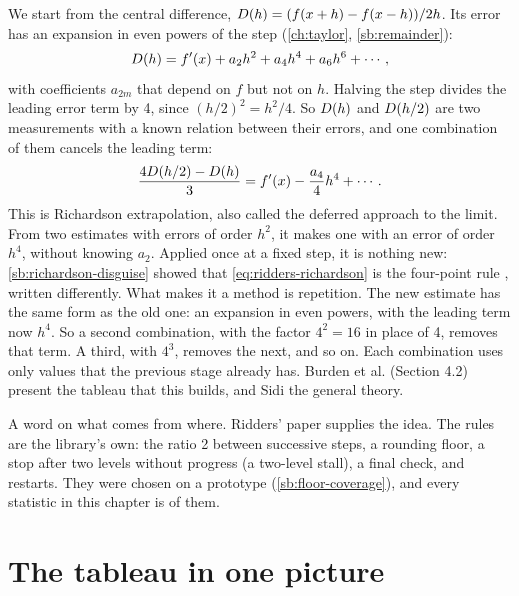 We start from the central difference, $D(h) = (f(x + h) - f(x - h)) / 2h$. Its error has an expansion in even
powers of the step (\cref{ch:taylor}, \cref{sb:remainder}):
\[
  D(h) = f'(x) + a_2 h^2 + a_4 h^4 + a_6 h^6 + \cdots ,
\]
with coefficients $a_{2m}$ that depend on $f$ but not on $h$. Halving the step divides the leading error term by
4, since $(h/2)^2 = h^2 / 4$. So $D(h)$ and $D(h/2)$ are two measurements with a known relation between their
errors, and one combination of them cancels the leading term:
\begin{equation}
  \frac{4 D(h/2) - D(h)}{3} = f'(x) - \frac{a_4}{4} h^4 + \cdots .
  \label{eq:ridders-richardson}
\end{equation}
This is Richardson extrapolation,\cite{richardson1911,richardson1927} also called the deferred approach to the
limit. From two estimates with errors of order $h^2$, it makes one with an error of order $h^4$, without knowing
$a_2$. Applied once at a fixed step, it is nothing new: \cref{sb:richardson-disguise} showed that
\cref{eq:ridders-richardson} is the four-point rule , written differently. What makes it a method is
repetition. The new estimate has the same form as the old one: an expansion in even powers, with the leading term
now $h^4$. So a second combination, with the factor $4^2 = 16$ in place of 4, removes that term. A third, with
$4^3$, removes the next, and so on. Each combination uses only values that the previous stage already has. Burden et
al.\cite{burden2016} (Section 4.2) present the tableau that this builds, and Sidi\cite{sidi2003} the general theory.

A word on what comes from where. Ridders' paper supplies the idea. The rules are the library's own: the ratio 2
between successive steps, a rounding floor, a stop after two levels without progress (a two-level stall), a final
check, and restarts. They were chosen on a prototype (\cref{sb:floor-coverage}), and every statistic in this chapter
is of them.

\section{The tableau in one picture}\label{sec:ridders-tableau}

\begin{figure}
\centering

\end{figure}

